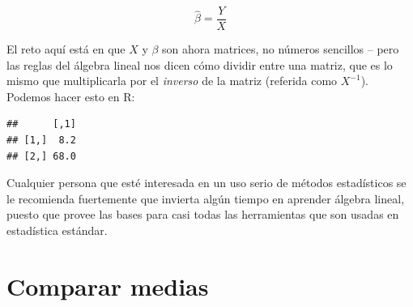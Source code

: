 \documentclass[
  12pt,
]{book}
\newenvironment{Shaded}{\begin{snugshade}}{\end{snugshade}}
\newcommand{\AttributeTok}[1]{\textcolor[rgb]{0.77,0.63,0.00}{#1}}
\newcommand{\CommentTok}[1]{\textcolor[rgb]{0.56,0.35,0.01}{\textit{#1}}}
\newcommand{\DecValTok}[1]{\textcolor[rgb]{0.00,0.00,0.81}{#1}}
\newcommand{\FunctionTok}[1]{\textcolor[rgb]{0.00,0.00,0.00}{#1}}
\newcommand{\NormalTok}[1]{#1}
\newcommand{\OtherTok}[1]{\textcolor[rgb]{0.56,0.35,0.01}{#1}}
\newcommand{\SpecialCharTok}[1]{\textcolor[rgb]{0.00,0.00,0.00}{#1}}
\begin{document}
\[
\hat{\beta} = \frac{Y}{X}
\]

El reto aquí está en que \(X\) y \(\beta\) son ahora matrices, no números sencillos -- pero las reglas del álgebra lineal nos dicen cómo dividir entre una matriz, que es lo mismo que multiplicarla por el \emph{inverso} de la matriz (referida como \(X^{-1}\)). Podemos hacer esto en R:

\begin{Shaded}
\end{Shaded}

\begin{verbatim}
##      [,1]
## [1,]  8.2
## [2,] 68.0
\end{verbatim}

Cualquier persona que esté interesada en un uso serio de métodos estadísticos se le recomienda fuertemente que invierta algún tiempo en aprender álgebra lineal, puesto que provee las bases para casi todas las herramientas que son usadas en estadística estándar.

\hypertarget{comparar-medias}{%
\chapter{Comparar medias}\label{comparar-medias}}
\end{document}
